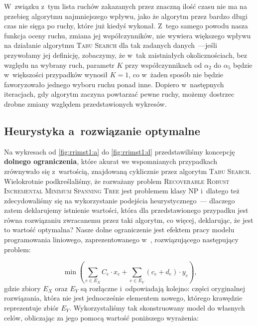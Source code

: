 W~związku z~tym lista ruchów zakazanych przez znaczną ilość czasu nie ma na przebieg algorytmu najmniejszego wpływu, jako że algorytm przez bardzo długi czas nie sięga po ruchy, które już kiedyś wykonał.
Z~tego samego powodu nasza funkcja oceny ruchu, zmiana jej współczynników, nie wywiera większego wpływu na działanie algorytmu \textsc{Tabu Search} dla tak zadanych danych~---jeśli przywołamy jej definicję, zobaczymy, że w~tak zaistniałych okolicznościach, bez względu na wybrany ruch, parametr $K$ przy współczynnikach od $\alpha_{2}$ do $\alpha_{5}$ będzie w~większości przypadków wynosił $K = 1$, co w~żaden sposób nie będzie faworyzowało jednego wyboru ruchu ponad inne.
Dopiero w~następnych iteracjach, gdy algorytm zaczyna powtarzać pewne ruchy, możemy dostrzec drobne zmiany względem przedstawionych wykresów.



\subsection{Heurystyka a~rozwiązanie optymalne}



Na wykresach od \ref{fig:rrimst1:a} do \ref{fig:rrimst1:d} przedstawiliśmy koncepcję \textbf{dolnego ograniczenia}, które akurat we wspomnianych przypadkach zrównywało się z~wartością, znajdowaną cyklicznie przez algorytm \textsc{Tabu Search}.
Wielokrotnie podkreślaliśmy, że rozważany problem \textsc{Recoverable Robust Incremental Minimum Spanning Tree} jest problemem klasy \textsc{NP} i~dlatego też zdecydowaliśmy się na wykorzystanie podejścia heurystycznego~--- dlaczego zatem deklarujemy istnienie wartości, która dla przedstawionego przypadku jest równa rozwiązaniu zwracanemu przez taki algorytm, co więcej, deklarując, że jest to wartość optymalna?
Nasze dolne ograniczenie jest efektem pracy modelu programowania liniowego, zaprezentowanego w~\cite{DBLP:journals/corr/HradovichKZ16}, rozwiązującego następujący problem:

\begin{equation}
	\min \left( \sum_{e \in E_{X}} C_{e} \cdot x_{e} + \sum_{e \in E_{Y}} \left( c_{e} + d_{e} \right) \cdot y_{e} \right)\text{,}
\end{equation}
gdzie zbiory $E_{X}$ oraz $E_{Y}$ są rozłączne i~odpowiadają kolejno: części oryginalnej rozwiązania, która nie jest jednocześnie elementem nowego, którego krawędzie reprezentuje zbiór $E_{Y}$.
Wykorzystaliśmy tak skonstruowany model do własnych celów, obliczając za jego pomocą wartość poniższego wyrażenia:

